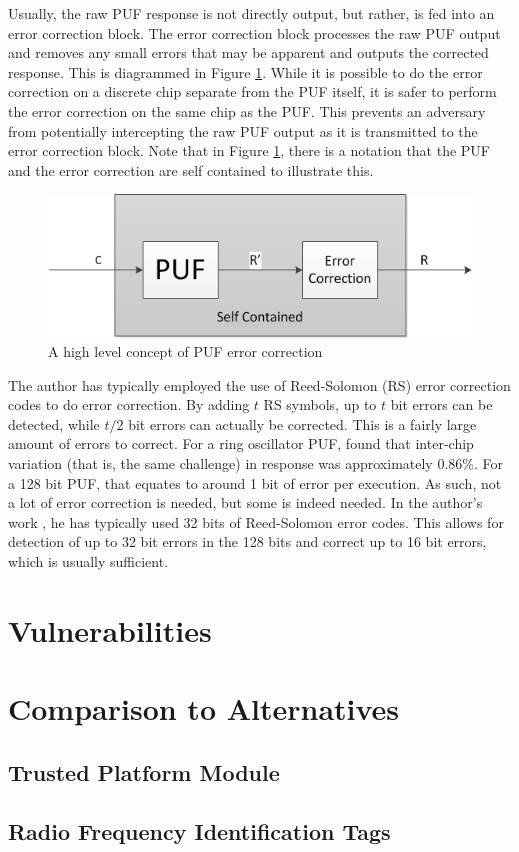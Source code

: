 Usually, the raw PUF response is not directly output, but rather, is fed into an
error correction block. The error correction block processes the raw PUF output and
removes any small errors that may be apparent and outputs the corrected response.
This is diagrammed in Figure \ref{fig:pufecc}. While it is possible to do the error
correction on a discrete chip separate from the PUF itself, it is safer to perform the
error correction on the same chip as the PUF. This prevents an adversary from potentially
intercepting the raw PUF output as it is transmitted to the error correction block. Note
that in Figure \ref{fig:pufecc}, there is a notation that the PUF and the error correction
are self contained to illustrate this.

\begin{figure}[h]
\includegraphics[]{images/puf_ecc.png}
\caption{A high level concept of PUF error correction}
\label{fig:pufecc}
\end{figure}

The author has typically employed the use of Reed-Solomon (RS) error correction codes to do 
error correction. By adding $t$ RS symbols, up to $t$ bit errors can be detected, 
while $t/2$ bit errors can actually be corrected. This is a fairly large amount of
errors to correct. For a ring oscillator PUF, \cite{pufhammingdistance} found that inter-chip
variation (that is, the same challenge) in response was approximately 0.86\%. For a 128 bit PUF,
that equates to around 1 bit of error per execution. As such, not a lot of error correction is needed,
but some is indeed needed. In the author's work \cite{PEAR} \cite{PUFROK} \cite{CODASPY}, he has typically 
used 32 bits of Reed-Solomon error codes. This allows for detection of up to 32 bit errors 
in the 128 bits and correct up to 16 bit errors, which is usually sufficient.

\section{Vulnerabilities}



\section{Comparison to Alternatives}

\subsection{Trusted Platform Module}

\subsection{Radio Frequency Identification Tags}

